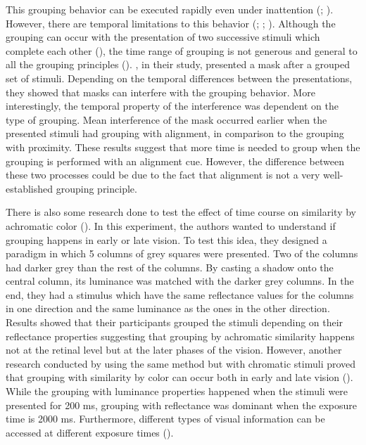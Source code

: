 \documentclass{article}
\begin{document}
This grouping behavior can be executed rapidly even under inattention (\cite{RN192}; \cite{RN207}). However, there are temporal limitations to this behavior (\cite{RN228}; \cite{RN233}; \cite{RN225}). Although the grouping can occur with the presentation of two successive stimuli which complete each other (\cite{RN233}), the time range of grouping is not generous and general to all the grouping principles (\cite{RN228}). \citeauthor{RN228}, in their study, presented a mask after a grouped set of stimuli. Depending on the temporal differences between the presentations, they showed that masks can interfere with the grouping behavior. More interestingly, the temporal property of the interference was dependent on the type of grouping. Mean interference of the mask occurred earlier when the presented stimuli had grouping with alignment, in comparison to the grouping with proximity. These results suggest that more time is needed to group when the grouping is performed with an alignment cue. However, the difference between these two processes could be due to the fact that alignment is not a very well-established grouping principle.

There is also some research done to test the effect of time course on similarity by achromatic color (\cite{RN234}). In this experiment, the authors wanted to understand if grouping happens in early or late vision. To test this idea, they designed a paradigm in which 5 columns of grey squares were presented. Two of the columns had darker grey than the rest of the columns. By casting a shadow onto the central column, its luminance  was matched with the darker grey columns. In the end, they had a stimulus which have the same reflectance values for the columns in one direction and the same luminance as the ones in the other direction. Results showed that their participants grouped the stimuli depending on their reflectance properties suggesting that grouping by achromatic similarity happens not at the retinal level but at the later phases of the vision. However, another research conducted by \citeauthor{RN229} using the same method but with chromatic stimuli proved that grouping with similarity by color can occur both in early and late vision (\citeyear{RN229}). While the grouping with luminance properties happened when the stimuli were presented for 200 ms, grouping with reflectance was dominant when the exposure time is 2000 ms. Furthermore, different types of visual information can be accessed at different exposure times (\cite{RN235}).  
\end{document}
